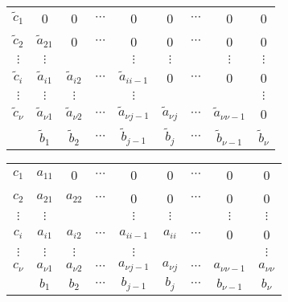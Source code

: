 \begin{slide}
\ \\
\begin{tabular}{c|cccccccc}
$\tilde{c}_1$& 0 & 0 & $\cdots$ & 0 & 0 & $\cdots$ & 0 & 0\\
$\tilde{c}_2$& $\tilde{a}_{21}$ & 0 & $\cdots$ & 0 & 0 & $\cdots$ & 0 & 0\\
$\vdots$& $\vdots$ &  & & $\vdots$& $\vdots$ & & $\vdots$ & $\vdots$\\
$\tilde{c}_i$& $\tilde{a}_{i1}$ & $\tilde{a}_{i2}$ & $\cdots$ & $\tilde{a}_{ii-1}$ & 0 & $\cdots$ & 0 & 0\\
$\vdots$& $\vdots$ & $\vdots$ & & $\vdots$ & & & & $\vdots$\\
$\tilde{c}_\nu$& $\tilde{a}_{\nu 1}$ & $\tilde{a}_{\nu 2}$ & $\cdots$ & $\tilde{a}_{\nu j-1}$ & $\tilde{a}_{\nu j}$ & $\cdots$ & $\tilde{a}_{\nu\nu-1}$ & 0\\
\hline
& $\tilde{b}_1$ & $\tilde{b}_2$ & $\cdots$ & $\tilde{b}_{j-1}$ & $\tilde{b}_j$ & $\cdots$ & $\tilde{b}_{\nu-1}$ & $\tilde{b}_\nu$\\
\end{tabular}
\hspace{1cm}
\begin{tabular}{c|cccccccc}
$c_1$& {\color{red} $a_{11}$} & 0 & $\cdots$ & 0 & 0 & $\cdots$ & 0 & 0\\
$c_2$& ${a}_{21}$ & {\color{red} $a_{22}$} & $\cdots$ & 0 & 0 & $\cdots$ & 0 & 0\\
$\vdots$& $\vdots$ &  & & $\vdots$& $\vdots$ & & $\vdots$ & $\vdots$\\
$c_i$& ${a}_{i1}$ & ${a}_{i2}$ & $\cdots$ & ${a}_{ii-1}$ & {\color{red} $a_{ii}$} & $\cdots$ & 0 & 0\\
$\vdots$& $\vdots$ & $\vdots$ & & $\vdots$ & & & & $\vdots$\\
$c_\nu$& ${a}_{\nu 1}$ & ${a}_{\nu 2}$ & $\cdots$ & ${a}_{\nu j-1}$ & ${a}_{\nu j}$ & $\cdots$ & ${a}_{\nu\nu-1}$ & {\color{red} $a_{\nu\nu}$}\\
\hline
& ${b}_1$ & ${b}_2$ & $\cdots$ & ${b}_{j-1}$ & ${b}_j$ & $\cdots$ & ${b}_{\nu-1}$ & ${b}_\nu$\\
\end{tabular}


\end{slide}

